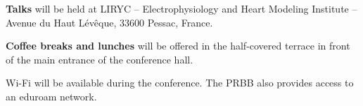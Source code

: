 \textbf{Talks} will be held at LIRYC – Electrophysiology and Heart Modeling Institute – Avenue du Haut Lévêque, 33600 Pessac, France. 

\textbf{Coffee breaks and lunches} will be offered in the half-covered terrace in front of the main entrance of the conference hall.

Wi-Fi will be available during the conference. The PRBB also provides access to an eduroam network.




	

